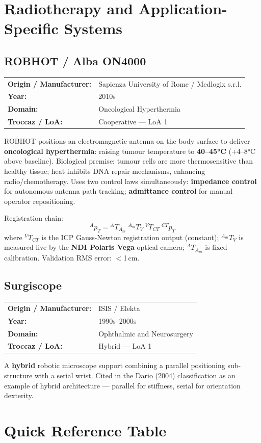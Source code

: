 \documentclass[11pt,a4paper,twoside]{report}
\makeatletter
\newcommand{\robotmeta}[4]{%
  \noindent\begin{tabular}{@{}ll@{}}
    \textbf{Origin / Manufacturer:} & #1 \\
    \textbf{Year:}                  & #2 \\
    \textbf{Domain:}                & #3 \\
    \textbf{Troccaz / LoA:}         & #4 \\
  \end{tabular}\par\smallskip\noindent}
\makeatother
\begin{document}
\chapter{Radiotherapy and Application-Specific Systems}

\section{ROBHOT / Alba ON4000}
\robotmeta{Sapienza University of Rome / Medlogix s.r.l.}{2010s}{Oncological Hyperthermia}{Cooperative — LoA 1}
ROBHOT positions an electromagnetic antenna on the body surface to deliver \textbf{oncological hyperthermia}: raising tumour temperature to \textbf{40--45°C} ($+$4--8°C above baseline). Biological premise: tumour cells are more thermosensitive than healthy tissue; heat inhibits DNA repair mechanisms, enhancing radio/chemotherapy. Uses two control laws simultaneously: \textbf{impedance control} for autonomous antenna path tracking; \textbf{admittance control} for manual operator repositioning.

Registration chain:
\[ {}^Ap_T = {}^AT_{A_m}\;{}^{A_m}T_V\;{}^VT_{CT}\;{}^{CT}p_T \]
where ${}^VT_{CT}$ is the ICP Gauss-Newton registration output (constant); ${}^{A_m}T_V$ is measured live by the \textbf{NDI Polaris Vega} optical camera; ${}^AT_{A_m}$ is fixed calibration. Validation RMS error: $<$1\,cm.

\section{Surgiscope}
\robotmeta{ISIS / Elekta}{1990s--2000s}{Ophthalmic and Neurosurgery}{Hybrid — LoA 1}
A \textbf{hybrid} robotic microscope support combining a parallel positioning sub-structure with a serial wrist. Cited in the Dario (2004) classification as an example of hybrid architecture — parallel for stiffness, serial for orientation dexterity.

\chapter{Quick Reference Table}
\end{document}
